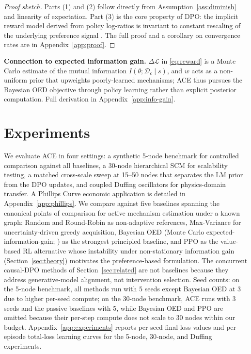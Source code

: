 \documentclass{article}
\theoremstyle{plain}
\theoremstyle{definition}
\theoremstyle{remark}
\begin{document}
\begin{proof}[Proof sketch]
Parts (1) and (2) follow directly from Assumption~\ref{ass:diminish} and linearity of expectation. Part (3) is the core property of DPO: the implicit reward model derived from policy log-ratios is invariant to constant rescaling of the underlying preference signal \citep{rafailov2023direct}. The full proof and a corollary on convergence rates are in Appendix~\ref{app:proof}.
\end{proof}

\textbf{Connection to expected information gain.} $\Delta\mathcal{L}$ in \eqref{eq:reward} is a Monte Carlo estimate of the mutual information $I(\theta; \mathcal{D}_c \mid s)$, and $w$ acts as a non-uniform prior that upweights poorly-learned mechanisms; ACE thus pursues the Bayesian OED objective \citep{toth2022active} through policy learning rather than explicit posterior computation. Full derivation in Appendix~\ref{app:info-gain}.

\section{Experiments}
\label{sec:results}

We evaluate ACE in four settings: a synthetic 5-node benchmark for controlled comparison against all baselines, a 30-node hierarchical SCM for scalability testing, a matched cross-scale sweep at 15--50 nodes that separates the LM prior from the DPO updates, and coupled Duffing oscillators for physics-domain transfer. A Phillips Curve economic application is detailed in Appendix~\ref{app:phillips}. We compare against five baselines spanning the canonical points of comparison for active mechanism estimation under a known graph: Random and Round-Robin \citep{fisher1935design} as non-adaptive references, Max-Variance \citep{cohn1996active,gal2016dropout} for uncertainty-driven greedy acquisition, Bayesian OED (Monte Carlo expected-information-gain; \citealp{toth2022active,tigas2022interventions,zhou2024sample}) as the strongest principled baseline, and PPO \citep{schulman2017proximal} as the value-based RL alternative whose instability under non-stationary information gain (Section~\ref{sec:theory}) motivates the preference-based formulation. The concurrent causal-DPO methods of Section~\ref{sec:related} \citep{hu2026capo,le2026cdpo} are not baselines because they address generative-model alignment, not intervention selection. Seed counts: on the 5-node benchmark, all methods run with 5 seeds except Bayesian OED at 3 due to higher per-seed compute; on the 30-node benchmark, ACE runs with 3 seeds and the passive baselines with 5, while Bayesian OED and PPO are omitted because their per-step compute does not scale to 30 nodes within our budget. Appendix~\ref{app:experiments} reports per-seed final-loss values and per-episode total-loss learning curves for the 5-node, 30-node, and Duffing experiments.
\end{document}
